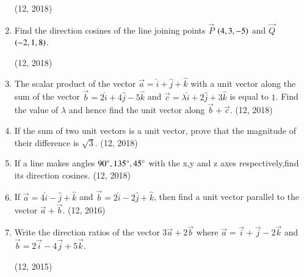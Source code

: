 \begin{enumerate}[label=\thesubsection.\arabic*,  ref=\thesubsection.\theenumi]
	\hfill (12, 2018)
\item Find the direction cosines of the line joining points $\vec{P}$ $\left(4,3,-5\right)$ and $\vec{Q}$ $\left(-2,1,8\right)$.

\hfill (12, 2018)
\item The scalar product of the vector $\overrightarrow{a} = \hat{i} + \hat{j} + \hat{k}$ with a unit vector along the sum of the vector $\overrightarrow{b} = 2\hat{i} + 4\hat{j} - 5\hat{k}$ and $\overrightarrow{c} = \lambda \hat{i} + 2\hat{j} + 3\hat{k}$ is equal to $1$. Find the value of $\lambda$ and hence find the unit vector along $\overrightarrow{b} + \overrightarrow{c}$.
\hfill (12, 2018) 
\item If the sum of two unit vectors is a unit vector, prove that the magnitude of their difference is $\sqrt{3}$.
\hfill (12, 2018) 
\item If a line makes angles $ 90\degree,135\degree,45\degree$ with the x,y and z axes respectively,find its direction cosines.
\hfill (12, 2018) 
\item If $\overrightarrow{a} = 4\hat{i} - \hat{j} +\hat{k}$ and $\overrightarrow{b} = 2\hat{i} - 2\hat{j} + \hat{k}$, then find a unit vector parallel to the vector $\overrightarrow{a}+\overrightarrow{b}$. \hfill (12, 2016)
\item Write the direction ratios of the vector $3\vec{a}+2\vec{b}$ where $\vec{a} = \vec{i}+\vec{j}-2\vec{k}$ and $\vec{b} = 2\vec{i}-4\vec{j}+5\vec{k}$.

	\hfill (12, 2015)
\end{enumerate}
